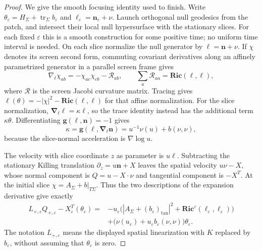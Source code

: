 \begin{proof}
We give the smooth focusing identity used to finish.  Write
$\theta_\varepsilon=H_\Sigma+\operatorname{tr}_\Sigma b_\varepsilon$
and $\ell_\varepsilon=\mathbf n_\varepsilon+\nu$.  Launch orthogonal
null geodesics from the patch, and intersect their local null
hypersurface with the stationary slices.  For each fixed
$\varepsilon$ this is a smooth construction for some positive time;
no uniform time interval is needed.  On each slice normalize the
null generator by $\ell=\mathbf n+\nu$.  If $\chi$ denotes its screen
second form, commuting covariant derivatives along an affinely
parametrized generator in a parallel screen frame gives
\[
 \nabla_\ell\chi_{ab}=-\chi_{ac}\chi_{cb}-\mathcal R_{ab},
 \qquad \sum_a\mathcal R_{aa}=\mathbf{Ric}(\ell,\ell),
\]
where $\mathcal R$ is the screen Jacobi curvature matrix.
Tracing gives $\ell(\theta)=-|\chi|^2-\mathbf{Ric}(\ell,\ell)$ for
that affine normalization.  For the slice normalization,
$\boldsymbol\nabla_\ell\ell=\kappa\ell$, so the trace identity instead
has the additional term $\kappa\theta$.  Differentiating
$\mathbf g(\ell,\mathbf n)=-1$ gives
\[
 \kappa=\mathbf g(\ell,\boldsymbol\nabla_\ell\mathbf n)
          =u^{-1}\nu(u)+b(\nu,\nu),
\]
because the slice-normal acceleration is $\nabla\log u$.

The velocity with slice coordinate $z$ as parameter is $u\ell$.
Subtracting the stationary Killing translation
$\partial_z=u\mathbf n+X$ leaves the spatial velocity $u\nu-X$,
whose normal component is $Q=u-X\cdot\nu$ and tangential component
is $-X^T$.  At the initial slice $\chi=A_\Sigma+b|_{T\Sigma}$.
Thus the two descriptions of the expansion derivative give exactly
\[
 \begin{split}
 L_{+,\varepsilon}Q_{+,\varepsilon}
       -X_\varepsilon^T(\theta_\varepsilon)
  ={}&-u_\varepsilon\bigl(
       |A_\Sigma+(b_\varepsilon)_{\mathrm{tan}}|^2
       +\mathbf{Ric}^\varepsilon(\ell_\varepsilon,
                                  \ell_\varepsilon)\bigr)\\
    &+\bigl(\nu(u_\varepsilon)
              +u_\varepsilon b_\varepsilon(\nu,\nu)\bigr)
                                                    \theta_\varepsilon.
 \end{split}
\]
The notation $L_{+,\varepsilon}$ means the displayed spatial
linearization with $K$ replaced by $b_\varepsilon$, without assuming
that $\theta_\varepsilon$ is zero.


\end{proof}
